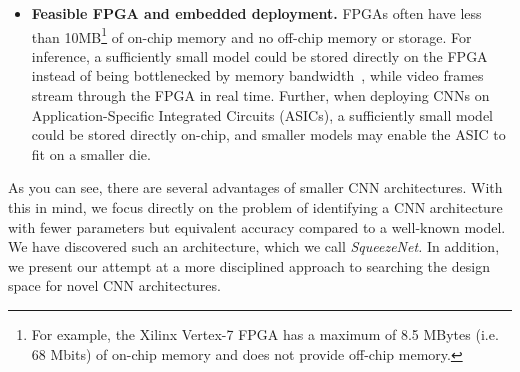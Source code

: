 \documentclass{article} %
\renewcommand{\cite}{\citep}
\begin{document}
\begin{itemize}
	\item[$\bullet$]{{\bf Feasible FPGA and embedded deployment.} FPGAs often have less than 10MB\footnote{For example, the Xilinx Vertex-7 FPGA has a maximum of 8.5 MBytes (i.e. 68 Mbits) of on-chip memory and does not provide off-chip memory.} of on-chip memory and no off-chip memory or storage. %
		For inference, a sufficiently small model could be stored directly on the FPGA instead of being bottlenecked by memory bandwidth~\cite{fpga2016cnn}, while video frames stream through the FPGA in real time.
		Further, when deploying CNNs on Application-Specific Integrated Circuits (ASICs), a sufficiently small model could be stored directly on-chip, and smaller models may enable the ASIC to fit on a smaller die.}
	
	
\end{itemize}

As you can see, there are several advantages of smaller CNN architectures.
With this in mind, we focus directly on the problem of identifying a CNN architecture with fewer parameters but equivalent accuracy compared to a well-known model.
We have discovered such an architecture, which we call {\em SqueezeNet.}
In addition, we present our attempt at a more disciplined approach to searching the design space for novel CNN architectures.
\end{document}
